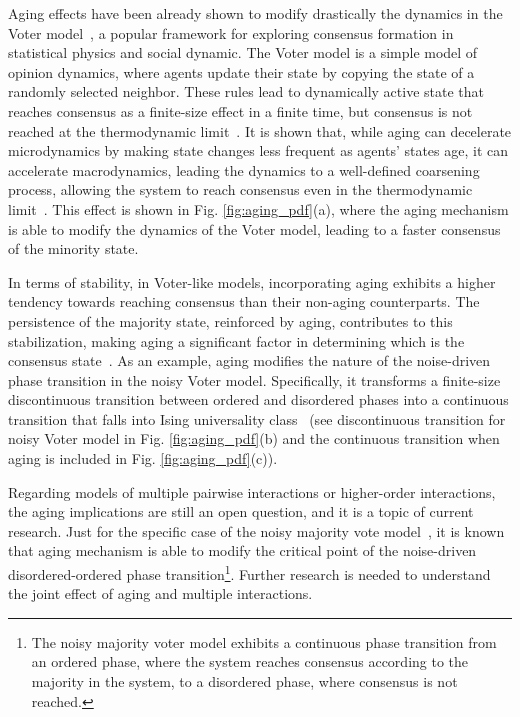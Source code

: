 Aging effects have been already shown to modify drastically the dynamics in the Voter model~\cite{Voter-original}, a popular framework for exploring consensus formation in statistical physics and social dynamic. The Voter model is a simple model of opinion dynamics, where agents update their state by copying the state of a randomly selected neighbor. These rules lead to dynamically active state that reaches consensus as a finite-size effect in a finite time, but consensus is not reached at the thermodynamic limit~\cite{Voter-original}. It is shown that, while aging can decelerate microdynamics by making state changes less frequent as agents' states age, it can accelerate macrodynamics, leading the dynamics to a well-defined coarsening process, allowing the system to reach consensus even in the thermodynamic limit~\cite{stark-2008,fernandez-gracia-2011, boguna-2014, perez-2016, peralta-2020C}. This effect is shown in Fig. \ref{fig:aging_pdf}(a), where the aging mechanism is able to modify the dynamics of the Voter model, leading to a faster consensus of the minority state.

In terms of stability, in Voter-like models, incorporating aging exhibits a higher tendency towards reaching consensus than their non-aging counterparts. The persistence of the majority state, reinforced by aging, contributes to this stabilization, making aging a significant factor in determining which is the consensus state~\cite{artime2019herding, peralta-2020C, baron2022analytical}. As an example, aging modifies the nature of the noise-driven phase transition in the noisy Voter model. Specifically, it transforms a finite-size discontinuous transition between ordered and disordered phases into a continuous transition that falls into Ising universality class~\cite{artime-2018} (see discontinuous transition for noisy Voter model in Fig. \ref{fig:aging_pdf}(b) and the continuous transition when aging is included in Fig. \ref{fig:aging_pdf}(c)).

Regarding models of multiple pairwise interactions or higher-order interactions, the aging implications are still an open question, and it is a topic of current research. Just for the specific case of the noisy majority vote model~\cite{chen-2020}, it is known that aging mechanism is able to modify the critical point of the noise-driven disordered-ordered phase transition\footnote{\sffamily\small The noisy majority voter model exhibits a continuous phase transition from an ordered phase, where the system reaches consensus according to the majority in the system, to a disordered phase, where consensus is not reached.}. Further research is needed to understand the joint effect of aging and multiple interactions.